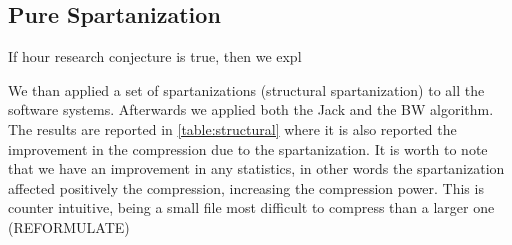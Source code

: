 \subsection{Pure Spartanization}
If hour research conjecture is true, then we expl 

We than applied a set of spartanizations (structural spartanization) to all the
software systems. Afterwards we applied both the Jack and the BW algorithm.
The results are reported in \cref{table:structural} where it is also
reported the improvement in the compression due to the spartanization. It is
worth to note that we have an improvement in any statistics, in other words the
spartanization affected positively the compression, increasing the compression
power. This is counter intuitive, being a small file most difficult to
compress than a larger one (REFORMULATE)

\begin{table}
  \caption{Aggregating statistics of compression power after a structural spartanization.
  Comparison with the compressione ratio obtained with Jack and BZip2.}
  \label{table:structural}
  \par\vspace{10pt plus 6pt minus 4pt}
  \centering
\end{table}

